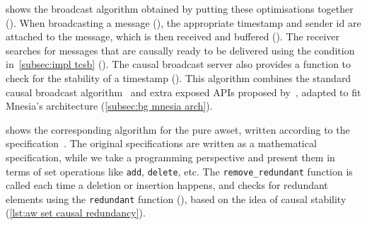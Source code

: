  shows the broadcast algorithm obtained by putting these optimisations
together (). 
When broadcasting a message (),
the appropriate timestamp and sender id are attached to the message, which is then
received and buffered (). The
receiver searches for messages that are causally ready to be delivered using
the condition in~\cref{subsec:impl tcsb} ().
The causal broadcast server also provides a function to check for the stability of a 
timestamp ().
This algorithm combines the standard causal broadcast
algorithm~\cite{birman1991causal,kleppmann2022dist-notes} and extra exposed 
APIs proposed by~\cite{baquero2014PureOp,baquero2017PureOp}, adapted to fit Mnesia's 
architecture (\cref{subsec:bg mnesia arch}).

 shows the corresponding algorithm for the pure \acrshort{awset},
written according to the specification~\cite{baquero2017PureOp,baquero2014PureOp}.
The original specifications
are written as a mathematical specification, while we take
a programming perspective and present them in terms of set operations like
\texttt{add}, \texttt{delete}, etc. The \verb|remove_redundant| function is called
each time a deletion or insertion happens, and checks
for redundant elements using the \verb|redundant| 
function (), based on the 
idea of causal stability (\cref{lst:aw set causal redundancy}).

